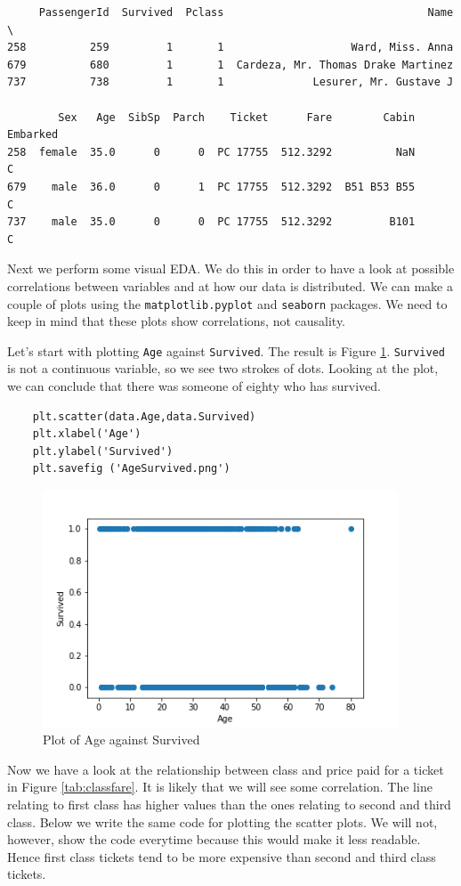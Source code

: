 \documentclass[11pt]{article}
\begin{document}
\begin{verbatim}
     PassengerId  Survived  Pclass                                Name  \
258          259         1       1                    Ward, Miss. Anna   
679          680         1       1  Cardeza, Mr. Thomas Drake Martinez   
737          738         1       1              Lesurer, Mr. Gustave J   

        Sex   Age  SibSp  Parch    Ticket      Fare        Cabin Embarked  
258  female  35.0      0      0  PC 17755  512.3292          NaN        C  
679    male  36.0      0      1  PC 17755  512.3292  B51 B53 B55        C  
737    male  35.0      0      0  PC 17755  512.3292         B101        C  
\end{verbatim}


Next we perform some visual EDA. We do this in order to have a look at possible correlations between variables and at how our data is distributed. We can make a couple of plots using the \texttt{matplotlib.pyplot} and \texttt{seaborn} packages. We need to keep in mind that these plots show correlations, not causality.  

Let's start with plotting \texttt{Age} against \texttt{Survived}. The result is Figure \ref{tab:agesurvived}. \texttt{Survived} is not a continuous variable, so we see two strokes of dots. Looking at the plot, we can conclude that there was someone of eighty who has survived. 
\begin{verbatim}
    plt.scatter(data.Age,data.Survived)
    plt.xlabel('Age')
    plt.ylabel('Survived')
    plt.savefig ('AgeSurvived.png')
\end{verbatim}

\begin{figure}[htbp]
\centering
\includegraphics[width=400px]{./AgeSurvived.png}
\caption{\label{tab:agesurvived}
Plot of Age against Survived}
\end{figure}
Now we have a look at the relationship between class and price paid for a ticket in Figure \ref{tab:classfare}. It is likely that we will see some correlation. The line relating to first class has higher values than the ones relating to second and third class. Below we write the same code for plotting the scatter plots. We will not, however, show the code everytime because this would make it less readable. Hence first class tickets tend to be more expensive than second and third class tickets. 
\end{document}
